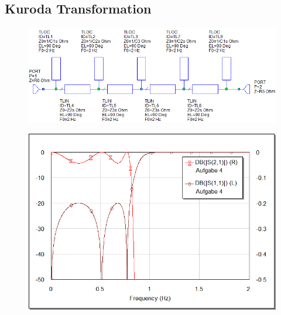 \subsection{Kuroda Transformation}

\begin{figure}
    \centering
    \includegraphics[width=\imagewidth]{images/stripline-kuroda}
    \caption{}
\end{figure}

\begin{figure}
    \centering
    \includegraphics[width=\imagewidth]{images/graph-kuroda}
    \caption{}
\end{figure}

